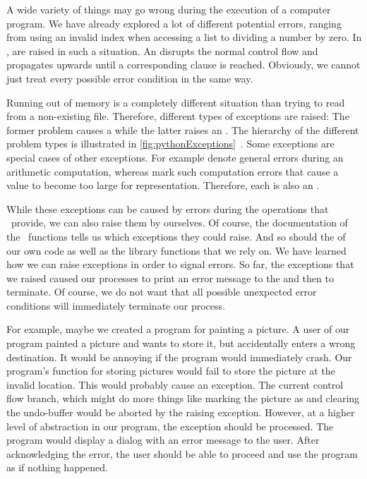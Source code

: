 %
A wide variety of things may go wrong during the execution of a computer program.
We have already explored a lot of different potential errors, ranging from using an invalid index when accessing a list to dividing a number by zero.
In \python,  are raised in such a situation.
An  disrupts the normal control flow and propagates upwards until a corresponding  clause is reached.
Obviously, we cannot just treat every possible error condition in the same way.

Running out of memory is a completely different situation than trying to read from a non-existing file.
Therefore, different types of exceptions are raised:
The former problem causes a  while the latter raises an .
The hierarchy of the different problem types is illustrated in \cref{fig:pythonExceptions}~\cite{PSF:P3D:TPSL:BIE}.
Some exceptions are special cases of other exceptions.
For example  denote general errors during an arithmetic computation, whereas  mark such computation errors that cause a value to become too large for representation.
Therefore, each  is also an .

While these exceptions can be caused by errors during the operations that \python\ provide, we can also raise them by ourselves.
Of course, the documentation of the \python\ functions tells us which exceptions they could raise.
And so should the  of our own code as well as the library functions that we rely on.%
\FloatBarrier%
\endhsection%
%
%
%
We have learned how we can raise exceptions in order to signal errors.
So far, the exceptions that we raised caused our processes to print an error message to the  and then to terminate.
Of course, we do not want that all possible unexpected error conditions will immediately terminate our process.

For example, maybe we created a program for painting a picture.
A user of our program painted a picture and wants to store it, but accidentally enters a wrong destination.
It would be annoying if the program would immediately crash.
Our program's function for storing pictures would fail to store the picture at the invalid location.
This would probably cause an exception.
The current control flow branch, which might do more things like marking the picture as  and clearing the undo-buffer would be aborted by the raising exception.
However, at a higher level of abstraction in our program, the exception should be processed.
The program would display a dialog with an error message to the user.
After acknowledging the error, the user should be able to proceed and use the program as if nothing happened.

